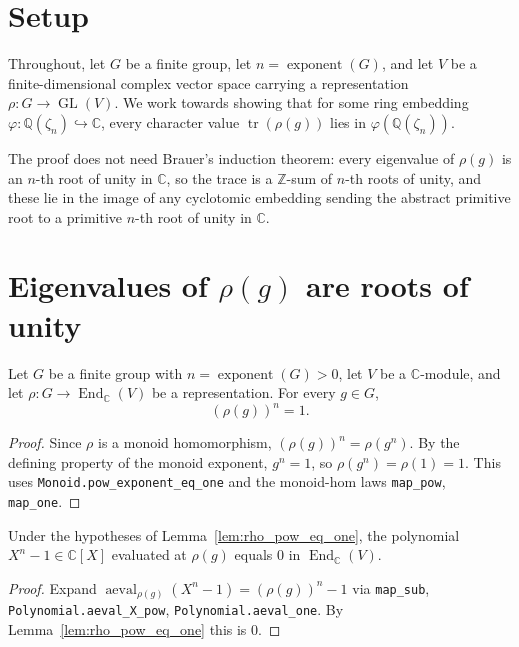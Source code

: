 


\section{Setup}

Throughout, let $G$ be a finite group, let $n = \operatorname{exponent}(G)$, and let
$V$ be a finite-dimensional complex vector space carrying a representation
$\rho : G \to \operatorname{GL}(V)$. We work towards showing that for some ring
embedding $\varphi : \mathbb{Q}(\zeta_n) \hookrightarrow \mathbb{C}$, every
character value $\operatorname{tr}(\rho(g))$ lies in $\varphi(\mathbb{Q}(\zeta_n))$.

The proof does not need Brauer's induction theorem: every eigenvalue of $\rho(g)$
is an $n$-th root of unity in $\mathbb{C}$, so the trace is a $\mathbb{Z}$-sum of
$n$-th roots of unity, and these lie in the image of any cyclotomic embedding
sending the abstract primitive root to a primitive $n$-th root of unity in
$\mathbb{C}$.

\section{Eigenvalues of $\rho(g)$ are roots of unity}

\begin{lemma}
    \label{lem:rho_pow_eq_one}
    \leanok
    Let $G$ be a finite group with $n = \operatorname{exponent}(G) > 0$, let $V$
    be a $\mathbb{C}$-module, and let $\rho : G \to \operatorname{End}_{\mathbb{C}}(V)$
    be a representation. For every $g \in G$,
    \[ (\rho(g))^{n} = 1. \]
\end{lemma}
\begin{proof}
    Since $\rho$ is a monoid homomorphism, $(\rho(g))^n = \rho(g^n)$. By the
    defining property of the monoid exponent, $g^n = 1$, so
    $\rho(g^n) = \rho(1) = 1$. This uses
    \texttt{Monoid.pow\_exponent\_eq\_one} and the monoid-hom laws
    \texttt{map\_pow}, \texttt{map\_one}.
\end{proof}

\begin{lemma}
    \label{lem:annihilating_polynomial}
    \leanok
    Under the hypotheses of Lemma~\ref{lem:rho_pow_eq_one}, the polynomial
    $X^n - 1 \in \mathbb{C}[X]$ evaluated at $\rho(g)$ equals $0$ in
    $\operatorname{End}_{\mathbb{C}}(V)$.
\end{lemma}
\begin{proof}
    Expand $\operatorname{aeval}_{\rho(g)}(X^n - 1) = (\rho(g))^n - 1$ via
    \texttt{map\_sub}, \texttt{Polynomial.aeval\_X\_pow},
    \texttt{Polynomial.aeval\_one}. By Lemma~\ref{lem:rho_pow_eq_one} this is $0$.
\end{proof}

